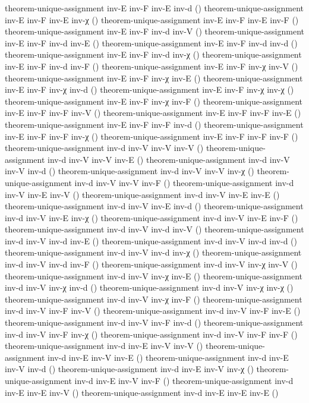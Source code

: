 \documentclass[11pt,a4paper]{article}
\begin{document}
\begin{code}
theorem-unique-assignment inv-E inv-F inv-E inv-d ()
theorem-unique-assignment inv-E inv-F inv-E inv-χ ()
theorem-unique-assignment inv-E inv-F inv-E inv-F ()
theorem-unique-assignment inv-E inv-F inv-d inv-V ()
theorem-unique-assignment inv-E inv-F inv-d inv-E ()
theorem-unique-assignment inv-E inv-F inv-d inv-d ()
theorem-unique-assignment inv-E inv-F inv-d inv-χ ()
theorem-unique-assignment inv-E inv-F inv-d inv-F ()
theorem-unique-assignment inv-E inv-F inv-χ inv-V ()
theorem-unique-assignment inv-E inv-F inv-χ inv-E ()
theorem-unique-assignment inv-E inv-F inv-χ inv-d ()
theorem-unique-assignment inv-E inv-F inv-χ inv-χ ()
theorem-unique-assignment inv-E inv-F inv-χ inv-F ()
theorem-unique-assignment inv-E inv-F inv-F inv-V ()
theorem-unique-assignment inv-E inv-F inv-F inv-E ()
theorem-unique-assignment inv-E inv-F inv-F inv-d ()
theorem-unique-assignment inv-E inv-F inv-F inv-χ ()
theorem-unique-assignment inv-E inv-F inv-F inv-F ()
theorem-unique-assignment inv-d inv-V inv-V inv-V ()
theorem-unique-assignment inv-d inv-V inv-V inv-E ()
theorem-unique-assignment inv-d inv-V inv-V inv-d ()
theorem-unique-assignment inv-d inv-V inv-V inv-χ ()
theorem-unique-assignment inv-d inv-V inv-V inv-F ()
theorem-unique-assignment inv-d inv-V inv-E inv-V ()
theorem-unique-assignment inv-d inv-V inv-E inv-E ()
theorem-unique-assignment inv-d inv-V inv-E inv-d ()
theorem-unique-assignment inv-d inv-V inv-E inv-χ ()
theorem-unique-assignment inv-d inv-V inv-E inv-F ()
theorem-unique-assignment inv-d inv-V inv-d inv-V ()
theorem-unique-assignment inv-d inv-V inv-d inv-E ()
theorem-unique-assignment inv-d inv-V inv-d inv-d ()
theorem-unique-assignment inv-d inv-V inv-d inv-χ ()
theorem-unique-assignment inv-d inv-V inv-d inv-F ()
theorem-unique-assignment inv-d inv-V inv-χ inv-V ()
theorem-unique-assignment inv-d inv-V inv-χ inv-E ()
theorem-unique-assignment inv-d inv-V inv-χ inv-d ()
theorem-unique-assignment inv-d inv-V inv-χ inv-χ ()
theorem-unique-assignment inv-d inv-V inv-χ inv-F ()
theorem-unique-assignment inv-d inv-V inv-F inv-V ()
theorem-unique-assignment inv-d inv-V inv-F inv-E ()
theorem-unique-assignment inv-d inv-V inv-F inv-d ()
theorem-unique-assignment inv-d inv-V inv-F inv-χ ()
theorem-unique-assignment inv-d inv-V inv-F inv-F ()
theorem-unique-assignment inv-d inv-E inv-V inv-V ()
theorem-unique-assignment inv-d inv-E inv-V inv-E ()
theorem-unique-assignment inv-d inv-E inv-V inv-d ()
theorem-unique-assignment inv-d inv-E inv-V inv-χ ()
theorem-unique-assignment inv-d inv-E inv-V inv-F ()
theorem-unique-assignment inv-d inv-E inv-E inv-V ()
theorem-unique-assignment inv-d inv-E inv-E inv-E ()

\end{code}
\end{document}
